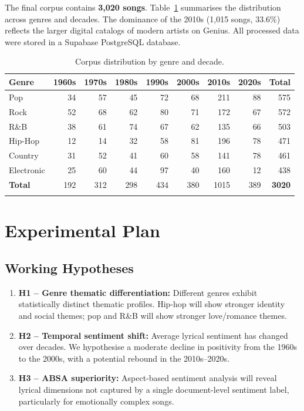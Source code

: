 \documentclass[pdflatex,sn-mathphys-num]{sn-jnl}
\begin{document}
The final corpus contains \textbf{3,020 songs}. Table~\ref{tab:corpus} summarises the distribution across genres and decades. The dominance of the 2010s (1,015 songs, 33.6\%) reflects the larger digital catalogs of modern artists on Genius. All processed data were stored in a Supabase PostgreSQL database.

\begin{table}[h]
\caption{Corpus distribution by genre and decade.}\label{tab:corpus}
\begin{tabular}{@{}lrrrrrrr|r@{}}
\toprule
\textbf{Genre} & \textbf{1960s} & \textbf{1970s} & \textbf{1980s} & \textbf{1990s} & \textbf{2000s} & \textbf{2010s} & \textbf{2020s} & \textbf{Total} \\
\midrule
Pop        & 34 & 57 & 45 & 72 & 68 & 211 & 88 & 575 \\
Rock       & 52 & 68 & 62 & 80 & 71 & 172 & 67 & 572 \\
R\&B       & 38 & 61 & 74 & 67 & 62 & 135 & 66 & 503 \\
Hip-Hop    & 12 & 14 & 32 & 58 & 81 & 196 & 78 & 471 \\
Country    & 31 & 52 & 41 & 60 & 58 & 141 & 78 & 461 \\
Electronic & 25 & 60 & 44 & 97 & 40 & 160 & 12 & 438 \\
\midrule
\textbf{Total} & 192 & 312 & 298 & 434 & 380 & 1015 & 389 & \textbf{3020} \\
\botrule
\end{tabular}
\end{table}

\section{Experimental Plan}\label{sec4}

\subsection{Working Hypotheses}\label{subsec3}

\begin{enumerate}[noitemsep]
    \item \textbf{H1 -- Genre thematic differentiation:} Different genres exhibit statistically distinct thematic profiles. Hip-hop will show stronger identity and social themes; pop and R\&B will show stronger love/romance themes.
    \item \textbf{H2 -- Temporal sentiment shift:} Average lyrical sentiment has changed over decades. We hypothesise a moderate decline in positivity from the 1960s to the 2000s, with a potential rebound in the 2010s--2020s.
    \item \textbf{H3 -- ABSA superiority:} Aspect-based sentiment analysis will reveal lyrical dimensions not captured by a single document-level sentiment label, particularly for emotionally complex songs.
\end{enumerate}
\end{document}
